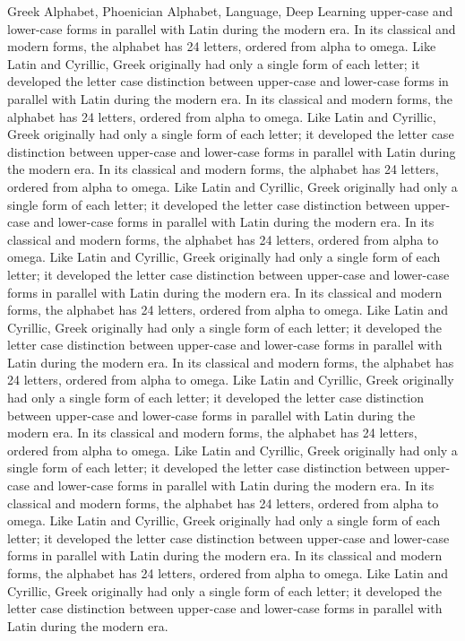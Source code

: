 \documentclass[doctor]{dutthesis} %
\begin{document}
\begin{englishabstract}{Greek Alphabet, Phoenician Alphabet, Language, Deep Learning}
upper-case and lower-case forms in parallel with Latin during the modern era.
In its classical and modern forms, the alphabet has 24 letters, ordered from
alpha to omega. Like Latin and Cyrillic, Greek originally had only a single
form of each letter; it developed the letter case distinction between
upper-case and lower-case forms in parallel with Latin during the modern era.
In its classical and modern forms, the alphabet has 24 letters, ordered from
alpha to omega. Like Latin and Cyrillic, Greek originally had only a single
form of each letter; it developed the letter case distinction between
upper-case and lower-case forms in parallel with Latin during the modern era.
In its classical and modern forms, the alphabet has 24 letters, ordered from
alpha to omega. Like Latin and Cyrillic, Greek originally had only a single
form of each letter; it developed the letter case distinction between
upper-case and lower-case forms in parallel with Latin during the modern era.
In its classical and modern forms, the alphabet has 24 letters, ordered from
alpha to omega. Like Latin and Cyrillic, Greek originally had only a single
form of each letter; it developed the letter case distinction between
upper-case and lower-case forms in parallel with Latin during the modern era.
In its classical and modern forms, the alphabet has 24 letters, ordered from
alpha to omega. Like Latin and Cyrillic, Greek originally had only a single
form of each letter; it developed the letter case distinction between
upper-case and lower-case forms in parallel with Latin during the modern era.
In its classical and modern forms, the alphabet has 24 letters, ordered from
alpha to omega. Like Latin and Cyrillic, Greek originally had only a single
form of each letter; it developed the letter case distinction between
upper-case and lower-case forms in parallel with Latin during the modern era.
In its classical and modern forms, the alphabet has 24 letters, ordered from
alpha to omega. Like Latin and Cyrillic, Greek originally had only a single
form of each letter; it developed the letter case distinction between
upper-case and lower-case forms in parallel with Latin during the modern era.
In its classical and modern forms, the alphabet has 24 letters, ordered from
alpha to omega. Like Latin and Cyrillic, Greek originally had only a single
form of each letter; it developed the letter case distinction between
upper-case and lower-case forms in parallel with Latin during the modern era.
In its classical and modern forms, the alphabet has 24 letters, ordered from
alpha to omega. Like Latin and Cyrillic, Greek originally had only a single
form of each letter; it developed the letter case distinction between
upper-case and lower-case forms in parallel with Latin during the modern era.
\end{englishabstract}
\tableofcontents
\tableofengcontents
\cleardoublepage
\end{document}
